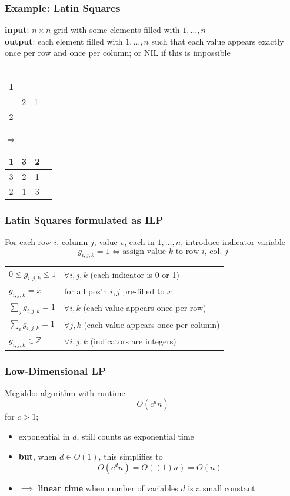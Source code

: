 \documentclass{beamer}
\newcommand{\stanza}{ \\~\ }
\begin{document}
\begin{frame} \frametitle{Example: Latin Squares}
\textbf{input}: $n \times n$ grid with some elements filled with $1, \ldots, n$ \\
\textbf{output}: each element filled with $1, \ldots, n$ such that each value
appears exactly once per row and once per column; or NIL if this is impossible \stanza
\begin{center}
\begin{tabular}{|c|c|c|c|} \hline
   1 &   &    \\ \hline
     & 2 & 1  \\ \hline
   2 &   &    \\ \hline
\end{tabular}
$\Longrightarrow$
\begin{tabular}{|c|c|c|c|} \hline
   1 & 3 & 2  \\ \hline
   3 & 2 & 1  \\ \hline
   2 & 1 & 3  \\ \hline
\end{tabular}
\end{center}
\end{frame}

\begin{frame} \frametitle{Latin Squares formulated as ILP}
For each row $i$, column $j$, value $v$, each in $1, \ldots, n$, introduce
indicator variable
\[ g_{i, j, k} = 1 \Leftrightarrow \text{assign value } k \text{ to row $i$, col. $j$} \]

\begin{tabular}{ll}
  $0 \leq g_{i, j, k} \leq 1$ & $\forall i, j, k$ (each indicator is 0 or 1) \\
  $g_{i, j, k} = x$ & for all pos'n $i, j$ pre-filled to $x$ \\
  $\sum_{j} g_{i, j, k} = 1$ & $\forall i, k$ (each value appears once per row) \\
  $\sum_{i} g_{i, j, k} = 1$ & $\forall j, k$ (each value appears once per column) \\
  $g_{i, j, k} \in \mathbb{Z}$ & $\forall i, j, k$ (indicators are integers) \\
\end{tabular}

\end{frame}

\begin{frame} \frametitle{Low-Dimensional LP}
Megiddo: algorithm with runtime
\[ O(c^d n) \]
for $c>1$;
\begin{itemize}
  \item exponential in $d$, still counts as exponential time
  \item \textbf{but}, when $d \in O(1)$, this simplifies to
  \[ O(c^d n) = O((1) n) = O(n) \]
  \item $\implies$ \textbf{linear time} when number of variables $d$ is a small
    constant
\end{itemize}
\end{frame}
\end{document}
